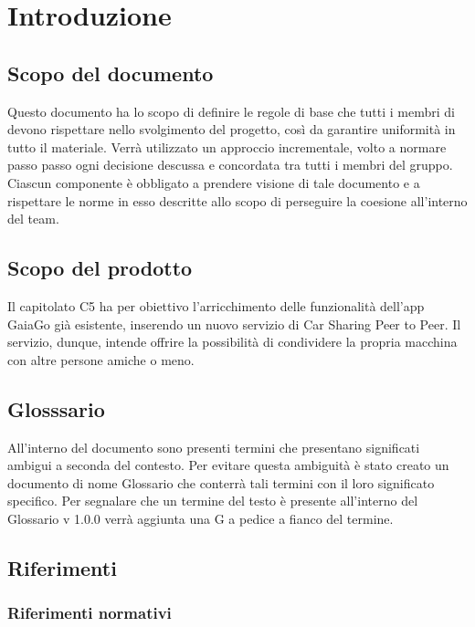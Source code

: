 \documentclass[a4paper]{article}
\begin{document}

\pagebreak	




\pagebreak

\tableofcontents
\section {Introduzione}
\subsection {Scopo del documento}
Questo documento  ha lo scopo di definire le regole di base che tutti i membri di \GroupName devono rispettare nello svolgimento del progetto, così da garantire uniformità in tutto il materiale. Verrà utilizzato un approccio incrementale, volto a normare passo passo ogni decisione descussa e concordata tra tutti i membri del gruppo. Ciascun componente è obbligato a prendere visione di tale documento e a rispettare le norme in esso descritte allo scopo di perseguire la coesione all'interno del team.
\subsection {Scopo del prodotto}
Il capitolato C5 ha per obiettivo l'arricchimento delle funzionalità dell'app GaiaGo già esistente, inserendo un nuovo servizio di Car Sharing Peer to Peer.
Il servizio, dunque, intende offrire la possibilità di condividere la propria macchina con altre persone amiche o meno.
\subsection {Glosssario}
All’interno del documento sono presenti termini che presentano significati ambigui a seconda del contesto.  Per evitare questa ambiguità è stato creato un documento di nome  Glossario  che  conterrà  tali  termini  con  il  loro  significato  specifico.   Per
segnalare  che  un  termine  del  testo  è  presente  all’interno  del
Glossario  v  1.0.0 verrà aggiunta una G a pedice a fianco del termine.
\subsection {Riferimenti}
\subsubsection {Riferimenti normativi}
\end{document}
